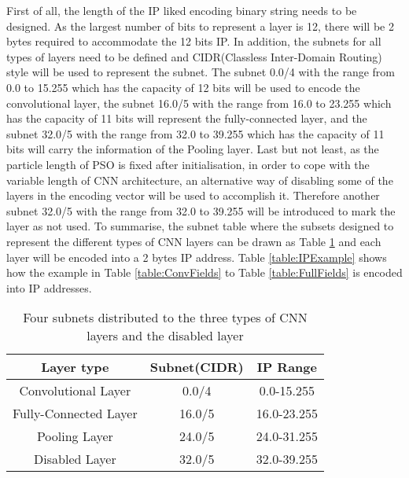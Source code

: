 \documentclass[conference]{IEEEtran}
\begin{document}
First of all, the length of the IP liked encoding binary string needs to be designed. As the largest number of bits to represent a layer is 12, there will be 2 bytes required to accommodate the 12 bits IP. 
In addition, the subnets for all types of layers need to be defined and CIDR(Classless Inter-Domain Routing) style will be used to represent the subnet. The subnet 0.0/4 with the range from 0.0 to 15.255 which has the capacity of 12 bits will be used to encode the convolutional layer, the subnet 16.0/5 with the range from 16.0 to 23.255 which has the capacity of 11 bits will represent the fully-connected layer, and the subnet 32.0/5 with the range from 32.0 to 39.255 which has the capacity of 11 bits will carry the information of the Pooling layer. 
Last but not least, as the particle length of PSO is fixed after initialisation,  in order to cope with the variable length of CNN architecture, an alternative way of disabling some of the layers in the encoding vector will be used to accomplish it. Therefore another subnet 32.0/5 with the range from 32.0 to 39.255 will be introduced to mark the layer as not used. 
To summarise, the subnet table where the subsets designed to represent the different types of CNN layers can be drawn as Table \ref{table:Subnets} and each layer will be encoded into a 2 bytes IP address. Table \ref{table:IPExample} shows how the example in Table \ref{table:ConvFields} to Table \ref{table:FullFields} is encoded into IP addresses. 

\begin{table}[!t]
	\renewcommand{\arraystretch}{1.3}
	\caption{Four subnets distributed to the three types of CNN layers and the disabled layer}
	\label{table:Subnets}
	\centering
	\begin{tabular}{|c|c|c|}
		\hline
		Layer type & Subnet(CIDR) & IP Range\\
		\hline
		Convolutional Layer & 0.0/4 & 0.0-15.255\\
		\hline
		Fully-Connected Layer & 16.0/5 & 16.0-23.255\\
		\hline
		Pooling Layer & 24.0/5 & 24.0-31.255\\
		\hline
		Disabled Layer & 32.0/5 & 32.0-39.255\\
		\hline
	\end{tabular}
\end{table}
\end{document}
